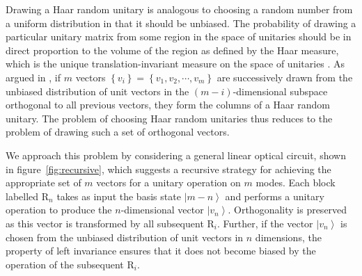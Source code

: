 \documentclass[aps,prl,twocolumn,floatfix]{revtex4}
\newcommand{\mat}[1]{\mathrm{#1}}
\newcommand{\ket}[1]{\left|#1\right\rangle}
\begin{document}
Drawing a Haar random unitary is analogous to choosing a random number from a
uniform distribution in that it should be unbiased. The probability of drawing
a particular unitary matrix from some region in the space of unitaries should
be in direct proportion to the volume of the region as defined by the Haar
measure, which is the unique translation-invariant measure on the space of
unitaries \cite{re-phd}. As argued in \cite{re-phd}, if \(m\) vectors \(\left\{
v_{i} \right\} = \left\{ v_{1}, v_{2}, \cdots, v_{m} \right\}\) are successively
drawn from the unbiased distribution of unit vectors in the
\(\left(m-i\right)\)-dimensional subspace orthogonal to all previous vectors,
they form the columns of a Haar random unitary. The problem of choosing Haar
random unitaries thus reduces to the problem of drawing such a set of orthogonal
vectors.

We approach this problem by considering a general linear optical circuit, shown
in figure~\ref{fig:recursive}, which suggests a recursive strategy for
achieving the appropriate set of \(m\) vectors for a unitary operation on \(m\)
modes. Each block labelled \(\mat{R}_{n}\) takes
as input the basis state \( \ket{m-n}\) and performs a unitary operation to
produce the \(n\)-dimensional vector \(\ket{v_n}\). Orthogonality is preserved
as this vector is transformed by all subsequent \(\mat{R}_{i}\). Further, if the
vector \(\ket{v_{n}}\) is chosen from the unbiased distribution of unit vectors
in \(n\) dimensions, the property of left invariance ensures that it does not
become biased by the operation of the subsequent \(\mat{R}_{i}\).
\end{document}

